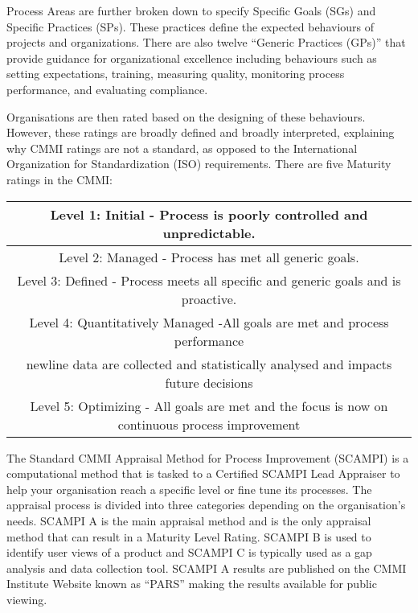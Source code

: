\documentclass{article}
\begin{document}
Process Areas are further broken down to specify Specific Goals (SGs) and Specific Practices (SPs). These practices define the expected behaviours of projects and organizations. There are also twelve “Generic Practices (GPs)” that provide guidance for organizational excellence including behaviours such as setting expectations, training, measuring quality, monitoring process performance, and evaluating compliance. \cite{cmmi} \newline

Organisations are then rated based on the designing of these behaviours. However, these ratings are broadly defined and broadly interpreted, explaining why CMMI ratings are not a standard, as opposed to the International Organization for Standardization (ISO) requirements. There are five Maturity ratings in the CMMI:

\begin{center}
\begin{tabular}{||c||} 
\hline
Level 1: Initial - Process is poorly controlled and unpredictable.\\ 
\hline
Level 2: Managed - Process has met all generic goals. \\ 
\hline
Level 3: Defined - Process meets all specific and generic goals and is proactive. \\
\hline
Level 4: Quantitatively Managed -All goals are met and process performance\\newline data are collected and statistically analysed and impacts future decisions \\
\hline
Level 5: Optimizing - All goals are met and the focus is now on continuous process improvement \\
\hline
\end{tabular}
\end{center}

The Standard CMMI Appraisal Method for Process Improvement (SCAMPI) is a computational method that is tasked to a Certified SCAMPI Lead Appraiser to help your organisation reach a specific level or fine tune its processes. The appraisal process is divided into three categories depending on the organisation's needs. SCAMPI A is the main appraisal method and is the only appraisal method that can result in a Maturity Level Rating. SCAMPI B is used to identify user views of a product and SCAMPI C is typically used as a gap analysis and data collection tool. SCAMPI A results are published on the CMMI Institute Website known as “PARS” making the results available for public viewing. \cite{cmmi} \newline
\end{document}
